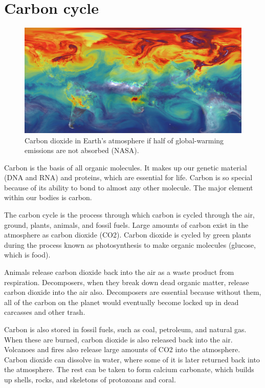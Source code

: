 \documentclass[]{book}
\begin{document}
\hypertarget{carbon-cycle}{%
\section{Carbon cycle}\label{carbon-cycle}}

\begin{figure}

{\centering \includegraphics[width=1\linewidth]{figures/co2-atmosphere} 

}

\caption{Carbon dioxide in Earth's atmosphere if half of global-warming emissions are not absorbed (NASA).}\label{fig:co2-atmosphere}
\end{figure}

Carbon is the basis of all organic molecules. It makes up our genetic material (DNA and RNA) and proteins, which are essential for life. Carbon is so special because of its ability to bond to almost any other molecule. The major element within our bodies is carbon.

The carbon cycle is the process through which carbon is cycled through the air, ground, plants, animals, and fossil fuels. Large amounts of carbon exist in the atmosphere as carbon dioxide (CO2). Carbon dioxide is cycled by green plants during the process known as photosynthesis to make organic molecules (glucose, which is food).

Animals release carbon dioxide back into the air as a waste product from respiration. Decomposers, when they break down dead organic matter, release carbon dioxide into the air also. Decomposers are essential because without them, all of the carbon on the planet would eventually become locked up in dead carcasses and other trash.

Carbon is also stored in fossil fuels, such as coal, petroleum, and natural gas. When these are burned, carbon dioxide is also released back into the air. Volcanoes and fires also release large amounts of CO2 into the atmosphere. Carbon dioxide can dissolve in water, where some of it is later returned back into the atmosphere. The rest can be taken to form calcium carbonate, which builds up shells, rocks, and skeletons of protozoans and coral.
\end{document}
